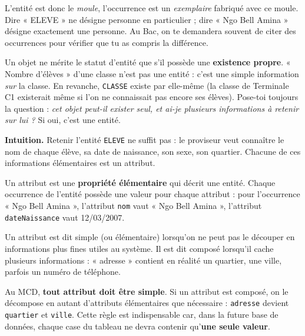 \documentclass[11pt]{article}
\newcommand{\cle}[1]{{\popxbold\color{popdark}#1}}
\newcounter{popsec}
\newcounter{popsub}
\newcommand{\courssub}[1]{%
  \stepcounter{popsub}%
  \par\vspace{9pt}\noindent{\popxbold\fontsize{11.5}{13}\selectfont\color{popink}{\color{poporange}\thepopsec.\thepopsub}\hspace{6pt}#1}\par\nopagebreak\vspace{4pt}
}
\begin{document}
L'entité est donc le \emph{moule}, l'occurrence est un \emph{exemplaire} fabriqué avec ce moule. Dire « ELEVE » ne désigne personne en particulier ; dire « Ngo Bell Amina » désigne exactement une personne. Au Bac, on te demandera souvent de citer des occurrences pour vérifier que tu as compris la différence.

\begin{attention}
Un objet ne mérite le statut d'entité que s'il possède une \textbf{existence propre}. « Nombre d'élèves » d'une classe n'est pas une entité : c'est une simple information \emph{sur} la classe. En revanche, \texttt{CLASSE} existe par elle-même (la classe de Terminale C1 existerait même si l'on ne connaissait pas encore ses élèves). Pose-toi toujours la question : \emph{cet objet peut-il exister seul, et ai-je plusieurs informations à retenir sur lui ?} Si oui, c'est une entité.
\end{attention}

\courssub{Les attributs : décrire chaque entité}

\textbf{Intuition.} Retenir l'entité \texttt{ELEVE} ne suffit pas : le proviseur veut connaître le nom de chaque élève, sa date de naissance, son sexe, son quartier. Chacune de ces informations élémentaires est un attribut.

\begin{definition}[Attribut]
Un \cle{attribut} est une \textbf{propriété élémentaire} qui décrit une entité. Chaque occurrence de l'entité possède une valeur pour chaque attribut : pour l'occurrence « Ngo Bell Amina », l'attribut \texttt{nom} vaut « Ngo Bell Amina », l'attribut \texttt{dateNaissance} vaut 12/03/2007.
\end{definition}

Un attribut est dit \cle{simple} (ou élémentaire) lorsqu'on ne peut pas le découper en informations plus fines utiles au système. Il est dit \cle{composé} lorsqu'il cache plusieurs informations : « adresse » contient en réalité un quartier, une ville, parfois un numéro de téléphone.

\begin{propriete}
Au MCD, \textbf{tout attribut doit être simple}. Si un attribut est composé, on le décompose en autant d'attributs élémentaires que nécessaire : \texttt{adresse} devient \texttt{quartier} et \texttt{ville}. Cette règle est indispensable car, dans la future base de données, chaque case du tableau ne devra contenir qu'\textbf{une seule valeur}.
\end{propriete}
\end{document}
